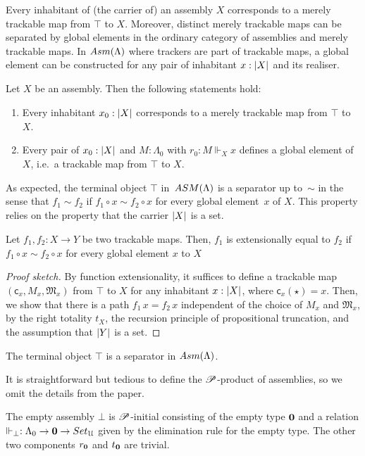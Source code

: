 \documentclass[a4paper,UKenglish,numberwithinsect,cleveref,thm-restate]{lipics-v2021}
\numberwithin{equation}{section}
\theoremstyle{plain}
\begin{document}
Every inhabitant of (the carrier of) an assembly $X$ corresponds to a merely trackable map from $\top$ to $X$.
Moreover, distinct merely trackable maps can be separated by global elements in the ordinary category of assemblies and merely trackable maps. 
In $\Asm(\Lambda)$ where trackers are part of trackable maps, a global element can be constructed for any pair of inhabitant $x : \mathopen{}\left|X\right|_{}^{}\mathclose{}$ and its realiser.
\begin{lemma}\label{lem:global-element}
  Let $X$ be an assembly. Then the following statements hold:
  \begin{enumerate}
    \item Every inhabitant $x_0 : \mathopen{}\left|X\right|_{}^{}\mathclose{}$ corresponds to a merely trackable map from $\top$ to $X$.
    \item Every pair of $x_0 : \mathopen{}\left|X\right|_{}^{}\mathclose{}$ and $M : \Lambda_0$ with $r_0 : M \Vdash_X x$ defines a global element of $X$, i.e.\ a trackable map from $\top$ to $X$.
  \end{enumerate}
\end{lemma}

As expected, the terminal object $\top$ in~$\ASM(\Lambda)$ is a separator up to~$\sim$ in the sense that $f_1 \sim f_2$ if $f_1 \circ x \sim f_2 \circ x$ for every global element~$x$ of $X$.
This property relies on the property that the carrier $\mathopen{}\left|X\right|_{}^{}\mathclose{}$ is a set.
\begin{proposition}
  Let $f_1, f_2 : X \to Y$ be two trackable maps. Then, 
  $f_1$ is extensionally equal to $f_2$ if
  $f_1 \circ x \sim f_2 \circ x$ for every global element $x$ to $X$ 
\end{proposition}
\begin{proof}[Proof sketch]
  By function extensionality, it suffices to define a trackable map $(\mathsf{c}_x, M_x, \mathfrak{M}_x)$ from $\top$ to $X$ for any inhabitant $x : \mathopen{}\left|X\right|_{}^{}\mathclose{}$, where $\mathsf{c}_x(\star) = x$.
  Then, we show that there is a path $f_1\,x = f_2\,x$ independent of the choice of $M_x$ and $\mathfrak{M}_x$, by the right totality $t_X$, the recursion principle of propositional truncation, and the assumption that $\mathopen{}\left|Y\right|_{}^{}\mathclose{}$ is a set. 
\end{proof}

\begin{corollary}
  The terminal object $\top$ is a separator in $\Asm(\Lambda)$.
\end{corollary}

It is straightforward but tedious to define the $\mathscr{P}$-product of assemblies, so we omit the details from the paper.
\begin{example}
The empty assembly $\bot$ is $\mathscr{P}$-initial consisting of the empty type $\mathbf{0}$ and a relation $\Vdash_\bot : \Lambda_0 \to \Empty \to \setU$ given by the elimination rule for the empty type.
The other two components $r_\mathbf{0}$ and $t_\mathbf{0}$ are trivial.
\end{example}
\end{document}
